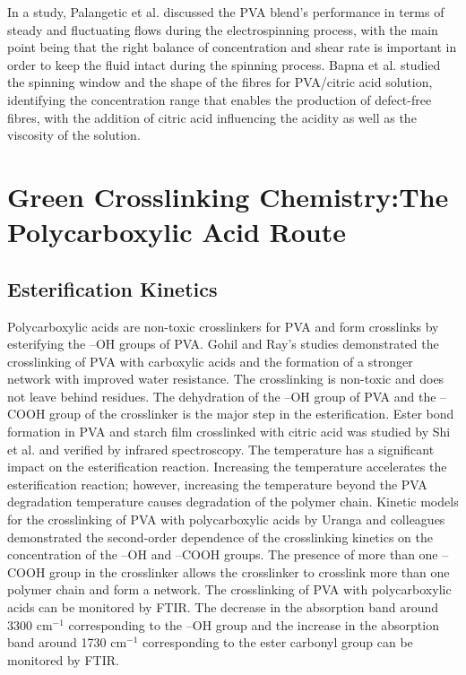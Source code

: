 \documentclass[12pt,a4paper]{report}
\begin{document}
In a study, Palangetic et al. discussed the PVA blend’s performance in terms of steady and fluctuating flows during the electrospinning process, with the main point being that the right balance of concentration and shear rate is important in order to keep the fluid intact during the spinning process.\cite{46} Bapna et al. studied the spinning window and the shape of the fibres for PVA/citric acid solution, identifying the concentration range that enables the production of defect-free fibres, with the addition of citric acid influencing the acidity as well as the viscosity of the solution.\cite{47}

\section{Green Crosslinking Chemistry:The Polycarboxylic Acid Route}
\subsection{Esterification Kinetics}
Polycarboxylic acids are non-toxic crosslinkers for PVA and form crosslinks by esterifying the –OH groups of PVA. Gohil and Ray’s studies demonstrated the crosslinking of PVA with carboxylic acids and the formation of a stronger network with improved water resistance. The crosslinking is non-toxic and does not leave behind residues.\cite{48} The dehydration of the –OH group of PVA and the –COOH group of the crosslinker is the major step in the esterification. Ester bond formation in PVA and starch film crosslinked with citric acid was studied by Shi et al. and verified by infrared spectroscopy.\cite{49} The temperature has a significant impact on the esterification reaction. Increasing the temperature accelerates the esterification reaction; however, increasing the temperature beyond the PVA degradation temperature causes degradation of the polymer chain. Kinetic models for the crosslinking of PVA with polycarboxylic acids by Uranga and colleagues demonstrated the second-order dependence of the crosslinking kinetics on the concentration of the –OH and –COOH groups. The presence of more than one –COOH group in the crosslinker allows the crosslinker to crosslink more than one polymer chain and form a network.\cite{50} The crosslinking of PVA with polycarboxylic acids can be monitored by FTIR. The decrease in the absorption band around 3300 cm\(^{-1}\) corresponding to the –OH group and the increase in the absorption band around 1730 cm\(^{-1}\) corresponding to the ester carbonyl group can be monitored by FTIR.\cite{36,53}
\end{document}
